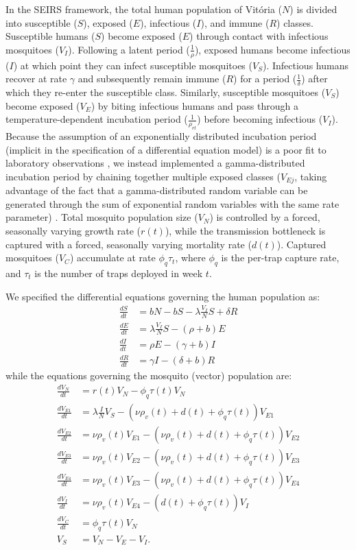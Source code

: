 \documentclass[10pt,letterpaper]{article}
\begin{document}
In the SEIRS framework, the total human population of Vit\'oria ($N$) is divided into susceptible ($S$), exposed ($E$), infectious ($I$), and immune ($R$) classes. 
Susceptible humans ($S$) become exposed ($E$) through contact with infectious mosquitoes ($V_I$).
Following a latent period ($\frac{1}{\rho}$), exposed humans become infectious ($I$) at which point they can infect susceptible mosquitoes ($V_S$).
Infectious humans recover at rate $\gamma$ and subsequently remain immune ($R$) for a period ($\frac{1}{\delta}$) after which they re-enter the susceptible class.
Similarly, susceptible mosquitoes ($V_S$) become exposed ($V_E$) by biting infectious humans and pass through a temperature-dependent incubation period ($\frac{1}{\rho_{vt}}$) before becoming infectious ($V_I$).
Because the assumption of an exponentially distributed incubation period (implicit in the specification of a differential equation model) is a poor fit to laboratory observations \cite{Chan2012}, we instead implemented a gamma-distributed incubation period by chaining together multiple exposed classes ($V_{Ej}$, taking advantage of the fact that a gamma-distributed random variable can be generated through the sum of exponential random variables with the same rate parameter) \cite{Lloyd2001}.
Total mosquito population size ($V_N$) is controlled by a forced, seasonally varying growth rate ($r(t)$), while the transmission bottleneck is captured with a forced, seasonally varying mortality rate ($d(t)$).
Captured mosquitoes ($V_C$) accumulate at rate $\phi_q \tau_t$, where $\phi_q$ is the per-trap capture rate, and $\tau_t$ is the number of traps deployed in week $t$.

We specified the differential equations governing the human population as:
\begin{align} 
\frac{dS}{dt} &= bN - bS - \lambda \frac{V_{I}}{N} S + \delta R\\
\frac{dE}{dt} &= \lambda \frac{V_{I}}{N} S - (\rho + b)E\\
\frac{dI}{dt} &= \rho E - (\gamma + b)I\\
\frac{dR}{dt} &= \gamma I - (\delta + b)R
\end{align}
while the equations governing the mosquito (vector) population are:
\begin{align}
\frac{dV_N}{dt} & = r(t) V_N - \phi_q \tau(t) V_N \\
\frac{dV_{E1}}{dt} &= \lambda \frac{I}{N} V_S - (\nu\rho_{v}(t) + d(t) + \phi_q \tau(t))V_{E1}\\
\frac{dV_{E2}}{dt} &= \nu\rho_{v}(t) V_{E1} - (\nu\rho_{v}(t) + d(t) + \phi_q \tau(t))V_{E2}\\
\frac{dV_{E3}}{dt} &= \nu\rho_{v}(t) V_{E2}  - (\nu\rho_{v}(t) + d(t) + \phi_q \tau(t))V_{E3}\\
\frac{dV_{E4}}{dt} &= \nu\rho_{v}(t) V_{E3}  - (\nu\rho_{v}(t) + d(t) + \phi_q \tau(t))V_{E4}\\
\frac{dV_I}{dt} &= \nu\rho_{v}(t) V_{E4} - (d(t) + \phi_q \tau(t)) V_I\\
\frac{dV_C}{dt} & = \phi_q \tau(t) V_N\\
V_S &= V_N - V_E - V_I.
\end{align}
\end{document}
